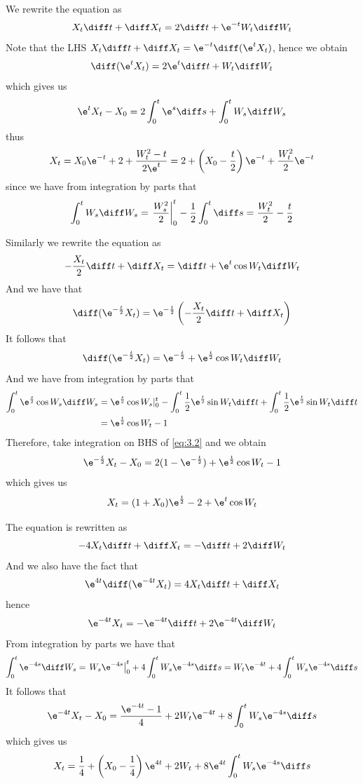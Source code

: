     \problem
    \begin{subproblem}[(3.\arabic*)]
        \item
        We rewrite the equation as
        \[X_t\diff t+\diff X_t=2\diff t+\e^{-t}W_t\diff W_t\]
        Note that the LHS $X_t\diff t+\diff X_t=\e^{-t}\diff (\e^tX_t)$,
        hence we obtain
        \[\diff (\e^t X_t)=2\e^t\diff t+W_t\diff W_t\]
        which gives us
        \[\e^tX_t-X_0=2\int_0^t\e^s\diff s+\int_0^tW_s\diff W_s\]
        thus
        \[X_t=X_0\e^{-t}+2+\frac{W_t^2-t}{2\e^t}
        =2+\left(X_0-\frac{t}{2}\right)\e^{-t}+\frac{W_t^2}{2}\e^{-t}\]
        since we have from integration by parts that
        \[\int_0^tW_s\diff W_s=\left.\frac{W_s^2}{2}\right|_0^t
        -\frac{1}{2}\int_0^t\diff s=\frac{W_t^2}{2}-\frac{t}{2}\]
       
        \item
        Similarly we rewrite the equation as
        \[-\frac{X_t}{2}\diff t+\diff X_t=\diff t+\e^t\cos W_t\diff W_t\]
        And we have that
        \[\diff(\e^{-\frac{t}{2}}X_t)
        =\e^{-\frac{t}{2}}\left(-\frac{X_t}{2}\diff t+\diff X_t\right)\]
        It follows that
        \begin{equation}
            \label{eq:3.2}    
            \diff (\e^{-\frac{t}{2}}X_t)=\e^{-\frac{t}{2}}+\e^{\frac{t}{2}}\cos W_t\diff W_t
        \end{equation}
        And we have from integration by parts that
        \[\begin{aligned}
            \int_0^t\e^{\frac{s}{2}}\cos W_s\diff W_s
            &=\e^{\frac{s}{2}}\cos W_s|_0^t
            -\int_0^t\frac{1}{2}\e^{\frac{t}{2}}\sin W_t\diff t
            +\int_0^t\frac{1}{2}\e^{\frac{t}{2}}\sin W_t\diff t\\
            &=\e^{\frac{t}{2}}\cos W_t-1
        \end{aligned}\]
        Therefore, take integration on BHS of \cref{eq:3.2} and we obtain
        \[\e^{-\frac{t}{2}}X_t-X_0=2(1-\e^{-\frac{t}{2}})+\e^{\frac{t}{2}}\cos W_t-1\]
        which gives us
        \[X_t=(1+X_0)\e^{\frac{t}{2}}-2+\e^t\cos W_t\]
        
        \item
        The equation is rewritten as
        \[-4X_t\diff t+\diff X_t=-\diff t+2\diff W_t\]
        And we also have the fact that
        \[\e^{4t}\diff(\e^{-4t}X_t)=4X_t\diff t+\diff X_t\]
        hence
        \[\e^{-4t}X_t=-\e^{-4t}\diff t+2\e^{-4t}\diff W_t\]
        From integration by parts we have that
        \[\int_0^t\e^{-4s}\diff W_s=\left.W_s\e^{-4s}\right|_0^t
        +4\int_0^tW_s\e^{-4s}\diff s
        =W_t\e^{-4t}+4\int_0^tW_s\e^{-4s}\diff s\]
        It follows that
        \[\e^{-4t}X_t-X_0=\frac{\e^{-4t}-1}{4}+2W_t\e^{-4t}+8\int_0^tW_s\e^{-4s}\diff s\]
        which gives us
        \[X_t=\frac{1}{4}+\left(X_0-\frac{1}{4}\right)\e^{4t}+2W_t
        +8\e^{4t}\int_0^tW_s\e^{-4s}\diff s\]

    \end{subproblem}

